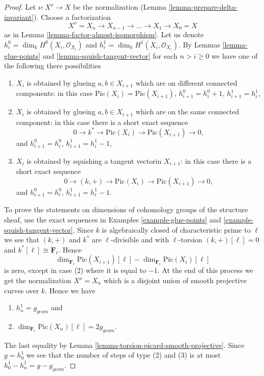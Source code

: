 \begin{proof}
Let $\nu : X^\nu \to X$ be the normalization
(Lemma \ref{lemma-prepare-delta-invariant}).
Choose a factorization
$$
X^\nu = X_n \to X_{n - 1} \to \ldots \to X_1 \to X_0 = X
$$
as in Lemma \ref{lemma-factor-almost-isomorphism}.
Let us denote $h^0_i = \dim_k H^0(X_i, \mathcal{O}_{X_i})$
and $h^1_i = \dim_k H^1(X_i, \mathcal{O}_{X_i})$.
By Lemmas \ref{lemma-glue-points} and \ref{lemma-squish-tangent-vector}
for each $n > i \geq 0$ we have
one of the following there possibilities
\begin{enumerate}
\item $X_i$ is obtained by glueing $a, b \in X_{i + 1}$
which are on different connected components: in this case
$\text{Pic}(X_i) = \text{Pic}(X_{i + 1})$,
$h^0_{i + 1} = h^0_i + 1$, $h^1_{i + 1} = h^1_i$,
\item $X_i$ is obtained by glueing $a, b \in X_{i + 1}$
which are on the same connected component: in this case
there is a short exact sequence
$$
0 \to k^* \to \text{Pic}(X_i) \to \text{Pic}(X_{i + 1}) \to 0,
$$
and $h^0_{i + 1} = h^0_i$, $h^1_{i + 1} = h^1_i - 1$,
\item $X_i$ is obtained by squishing a tangent vectorin $X_{i + 1}$:
in this case there is a short exact sequence
$$
0 \to (k, +) \to \text{Pic}(X_i) \to \text{Pic}(X_{i + 1}) \to 0,
$$
and $h^0_{i + 1} = h^0_i$, $h^1_{i + 1} = h^1_i - 1$.
\end{enumerate}
To prove the statements on dimensions of cohomology groups of the
structure sheaf, use the exact sequences in
Examples \ref{example-glue-points} and \ref{example-squish-tangent-vector}.
Since $k$ is algebraically closed of characteristic prime to $\ell$
we see that $(k, +)$ and $k^*$ are $\ell$-divisible and with
$\ell$-torsion $(k, +)[\ell] = 0$ and $k^*[\ell] \cong \mathbf{F}_\ell$.
Hence
$$
\dim_{\mathbf{F}_\ell} \text{Pic}(X_{i + 1})[\ell] -
\dim_{\mathbf{F}_\ell}\text{Pic}(X_i)[\ell]
$$
is zero, except in case (2) where it is equal to $-1$.
At the end of this process we get the normalization
$X^\nu = X_n$ which is a disjoint union of smooth projective
curves over $k$. Hence we have
\begin{enumerate}
\item $h^1_n = g_{geom}$ and
\item $\dim_{\mathbf{F}_\ell} \text{Pic}(X_n)[\ell] = 2g_{geom}$.
\end{enumerate}
The last equality by Lemma \ref{lemma-torsion-picard-smooth-projective}.
Since $g = h^1_0$ we see that the number of steps of type
(2) and (3) is at most $h^1_0 - h^1_n = g - g_{geom}$.

\end{proof}
